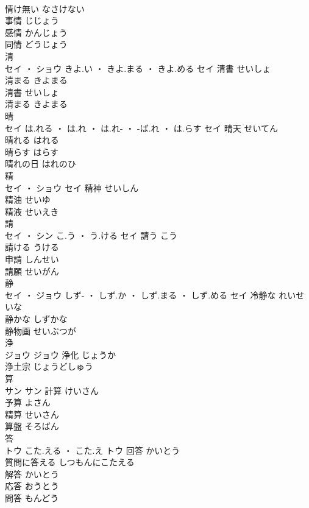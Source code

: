 \documentclass[8pt]{extreport}
\begin{document}
\begin{CJK}{UTF8}{min}
\\	情け無い	なさけない	
\\	事情	じじょう	
\\	感情	かんじょう	
\\	同情	どうじょう	
\\	清	
\\	セイ ・ ショウ	きよ.い ・ きよ.まる ・ きよ.める	セイ	清書	せいしょ	
\\	清まる	きよまる	
\\	清書	せいしょ	
\\	清まる	きよまる	
\\	晴	
\\	セイ	は.れる ・ は.れ ・ は.れ- ・ -ば.れ ・ は.らす	セイ	晴天	せいてん	
\\	晴れる	はれる	
\\	晴らす	はらす	
\\	晴れの日	はれのひ	
\\	精	
\\	セイ ・ ショウ		セイ	精神	せいしん	
\\	精油	せいゆ	
\\	精液	せいえき	
\\	請	
\\	セイ ・ シン	こ.う ・ う.ける	セイ	請う	こう	
\\	請ける	うける	
\\	申請	しんせい	
\\	請願	せいがん	
\\	静	
\\	セイ ・ ジョウ	しず- ・ しず.か ・ しず.まる ・ しず.める	セイ	冷静な	れいせいな	
\\	静かな	しずかな	
\\	静物画	せいぶつが	
\\	浄	
\\	ジョウ		ジョウ	浄化	じょうか	
\\	浄土宗	じょうどしゅう	
\\	算	
\\	サン		サン	計算	けいさん	
\\	予算	よさん	
\\	精算	せいさん	
\\	算盤	そろばん	
\\	答	
\\	トウ	こた.える ・ こた.え	トウ	回答	かいとう	
\\	質問に答える	しつもんにこたえる	
\\	解答	かいとう	
\\	応答	おうとう	
\\	問答	もんどう	

\end{CJK}
\end{document}
